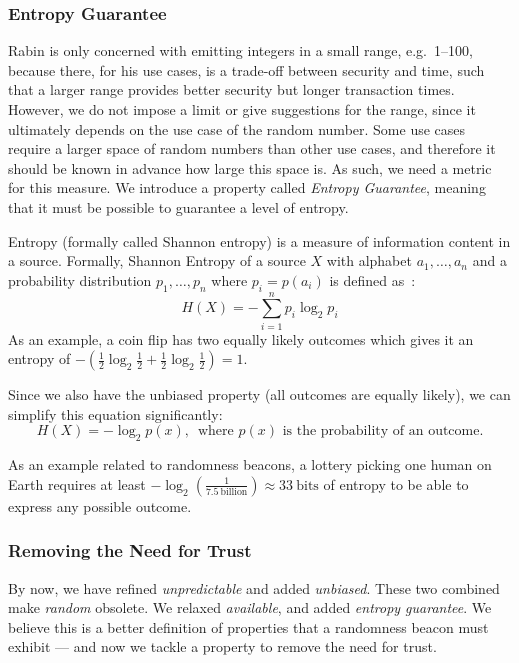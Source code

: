 \subsubsection{Entropy Guarantee}
Rabin is only concerned with emitting integers in a small range, e.g.\ 1--100, because there, for his use cases, is a trade-off between security and time, such that a larger range provides better security but longer transaction times.
However, we do not impose a limit or give suggestions for the range, since it ultimately depends on the use case of the random number. Some use cases require a larger space of random numbers than other use cases, and therefore it should be known in advance how large this space is. As such, we need a metric for this measure.
We introduce a property called \emph{Entropy Guarantee}, meaning that it must be possible to guarantee a level of entropy.

Entropy (formally called Shannon entropy) is a measure of information content in a source.
Formally, Shannon Entropy of a source $X$ with alphabet ${a_1, \ldots, a_n}$ and a probability distribution ${p_1, \ldots , p_n}$ where $p_i = p(a_i)$ is defined as~\cite{informationtheory}:
$$
H(X) = -\sum\limits_{i = 1}^n p_{i}\log_{2} p_{i}
$$
As an example, a coin flip has two equally likely outcomes which gives it an entropy of $-\left(\frac{1}{2}\log_2 \frac{1}{2} + \frac{1}{2}\log_2 \frac{1}{2}\right) = 1$.

Since we also have the unbiased property (all outcomes are equally likely), we can simplify this equation significantly:
$$
H(X) = -\log_{2}p(x)\text{,~~where }p(x)\text{ is the probability of an outcome.}
$$

As an example related to randomness beacons, a lottery picking one human on Earth requires at least $-\log_2\left(\frac{1}{7.5~\text{billion}}\right) \approx 33~\text{bits}$ of entropy to be able to express any possible outcome.

\subsubsection{Removing the Need for Trust}
By now, we have refined \emph{unpredictable} and added \emph{unbiased}. These two combined make \emph{random} obsolete. We relaxed \emph{available}, and added \emph{entropy guarantee}.
We believe this is a better definition of properties that a randomness beacon must exhibit --- and now we tackle a property to remove the need for trust.

